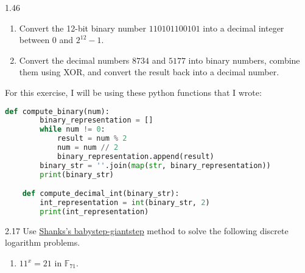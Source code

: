\begin{exercise}
    {1.46}
    \begin{enumerate}
        \item Convert the 12-bit binary number \(110101100101\) into a decimal integer between \(0\) and \(2^{12} - 1\).
              \setcounter{enumi}{4}

        \item Convert the decimal numbers \(8734\) and \(5177\) into binary numbers, combine them using XOR, and convert the result back into a decimal number.
    \end{enumerate}
\end{exercise}

For this exercise, I will be using these python functions that I wrote:
\begin{lstlisting}[language=python]
    def compute_binary(num):
        binary_representation = []
        while num != 0:
            result = num % 2
            num = num // 2
            binary_representation.append(result)
        binary_str = ''.join(map(str, binary_representation))
        print(binary_str)

    def compute_decimal_int(binary_str):
        int_representation = int(binary_str, 2)
        print(int_representation)
\end{lstlisting}


\begin{exercise}
    {2.17} Use \hyperlink{2.21}{Shanks's babystep-giantstep} method to solve the following discrete logarithm problems.
    \begin{enumerate}
        \item \(11^x = 21\) in \(\mathbb{F}_{71}\).
    \end{enumerate}
\end{exercise}

